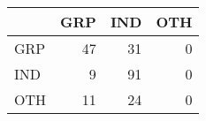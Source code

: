 \begin{tabular}{lrrr}
\hline
     &   GRP &   IND &   OTH \\
\hline
 GRP &    47 &    31 &     0 \\
 IND &     9 &    91 &     0 \\
 OTH &    11 &    24 &     0 \\
\hline
\end{tabular}